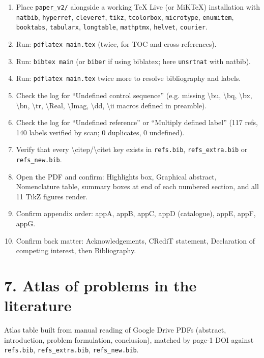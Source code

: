 \documentclass[12pt,a4paper]{article}
\begin{document}
\begin{enumerate}[nosep,leftmargin=1.6em]
\item Place {\tt paper\_v2/} alongside a working TeX Live (or MiKTeX) installation with {\tt natbib}, {\tt hyperref}, {\tt cleveref}, {\tt tikz}, {\tt tcolorbox}, {\tt microtype}, {\tt enumitem}, {\tt booktabs}, {\tt tabularx}, {\tt longtable}, {\tt mathptmx}, {\tt helvet}, {\tt courier}.
\item Run: {\tt pdflatex main.tex} (twice, for TOC and cross-references).
\item Run: {\tt bibtex main} (or {\tt biber} if using biblatex; here {\tt unsrtnat} with natbib).
\item Run: {\tt pdflatex main.tex} twice more to resolve bibliography and labels.
\item Check the log for ``Undefined control sequence'' (e.g. missing {\textbackslash bu}, {\textbackslash bq}, {\textbackslash bx}, {\textbackslash bn}, {\textbackslash tr}, {\textbackslash Real}, {\textbackslash Imag}, {\textbackslash dd}, {\textbackslash ii} macros defined in preamble).
\item Check the log for ``Undefined reference'' or ``Multiply defined label'' (117 refs, 140 labels verified by scan; 0 duplicates, 0 undefined).
\item Verify that every \textbackslash citep/\textbackslash citet key exists in {\tt refs.bib}, {\tt refs\_extra.bib} or {\tt refs\_new.bib}.
\item Open the PDF and confirm: Highlights box, Graphical abstract, Nomenclature table, summary boxes at end of each numbered section, and all 11 TikZ figures render.
\item Confirm appendix order: appA, appB, appC, appD (catalogue), appE, appF, appG.
\item Confirm back matter: Acknowledgements, CRediT statement, Declaration of competing interest, then Bibliography.
\end{enumerate}

\section*{7. Atlas of problems in the literature}

Atlas table built from manual reading of Google Drive PDFs (abstract, introduction, problem formulation, conclusion), matched by page-1 DOI against {\tt refs.bib}, {\tt refs\_extra.bib}, {\tt refs\_new.bib}.
\end{document}
